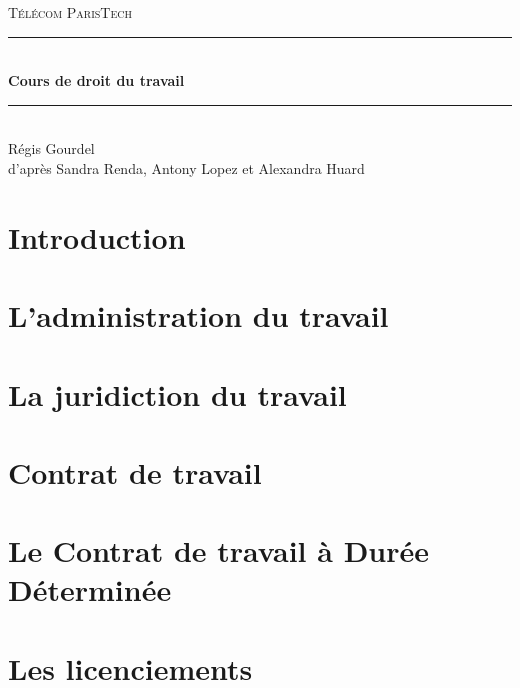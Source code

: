 \documentclass[a4paper,10pt]{article}
\theoremstyle{remark}
\begin{document}
\renewcommand{\contentsname}{Sommaire}
\setcounter{tocdepth}{1}



\begin{titlepage}
	\newcommand{\HRule}{\rule{\linewidth}{0.5mm}}

	\center

	\textsc{\LARGE Télécom ParisTech}\\[1.2cm]

	\HRule \\[0.8cm]
	{ \huge \bfseries Cours de droit du travail}\\[0.4cm]
	\HRule \\[1.4cm]
	
	{\selectfont
	Régis Gourdel\\
	d'après Sandra Renda, Antony Lopez et Alexandra Huard
	}
	
	\vspace{2cm}
	
	\tableofcontents


\end{titlepage}

\section{Introduction}
	

\section{L'administration du travail}
	

\section{La juridiction du travail}
	

\section{Contrat de travail}
	

\section{Le Contrat de travail à Durée Déterminée}
	

\section{Les licenciements}
	
\end{document}
